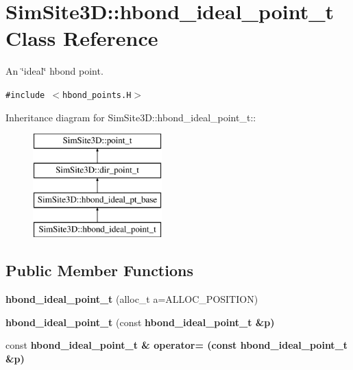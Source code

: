 \section{SimSite3D::hbond\_\-ideal\_\-point\_\-t Class Reference}
\label{classSimSite3D_1_1hbond__ideal__point__t}
An \char`\"{}ideal\char`\"{} hbond point.  


{\tt \#include $<$hbond\_\-points.H$>$}

Inheritance diagram for SimSite3D::hbond\_\-ideal\_\-point\_\-t::\begin{figure}[H]
\begin{center}
\leavevmode
\includegraphics[height=4cm]{classSimSite3D_1_1hbond__ideal__point__t}
\end{center}
\end{figure}
\subsection*{Public Member Functions}
\begin{CompactItemize}
\item 
\textbf{hbond\_\-ideal\_\-point\_\-t} (alloc\_\-t a=ALLOC\_\-POSITION)\label{classSimSite3D_1_1hbond__ideal__point__t_17edfda196584b6b9f2bd4c26ada8d7a}

\item 
\textbf{hbond\_\-ideal\_\-point\_\-t} (const \bf{hbond\_\-ideal\_\-point\_\-t} \&p)\label{classSimSite3D_1_1hbond__ideal__point__t_51934c9d9788021b09d2d24eb5b976e7}

\item 
const \bf{hbond\_\-ideal\_\-point\_\-t} \& \textbf{operator=} (const \bf{hbond\_\-ideal\_\-point\_\-t} \&p)\label{classSimSite3D_1_1hbond__ideal__point__t_9fcb68e2f672eebb7505ed413123a78c}

\end{CompactItemize}
